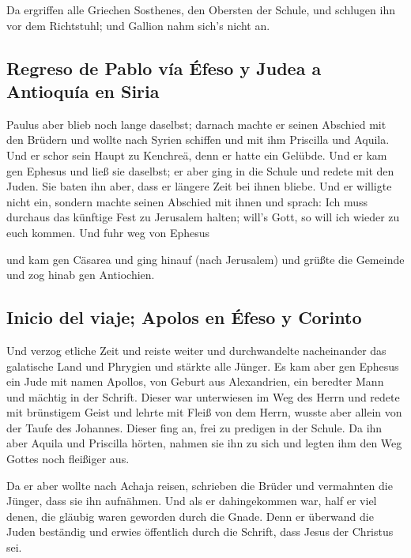  Da ergriffen alle Griechen Sosthenes, den Obersten der
Schule, und schlugen ihn vor dem Richtstuhl; und Gallion nahm sich's
nicht an.

\hypertarget{regreso-de-pablo-vuxeda-uxe9feso-y-judea-a-antioquuxeda-en-siria}{%
\subsection{Regreso de Pablo vía Éfeso y Judea a Antioquía en
Siria}\label{regreso-de-pablo-vuxeda-uxe9feso-y-judea-a-antioquuxeda-en-siria}}

 Paulus aber blieb noch lange daselbst; darnach machte er
seinen Abschied mit den Brüdern und wollte nach Syrien schiffen und mit
ihm Priscilla und Aquila. Und er schor sein Haupt zu Kenchreä, denn er
hatte ein Gelübde.  Und er kam gen Ephesus und ließ sie
daselbst; er aber ging in die Schule und redete mit den Juden.
 Sie baten ihn aber, dass er längere Zeit bei ihnen
bliebe. Und er willigte nicht ein,  sondern machte seinen
Abschied mit ihnen und sprach: Ich muss durchaus das künftige Fest zu
Jerusalem halten; will's Gott, so will ich wieder zu euch kommen. Und
fuhr weg von Ephesus

 und kam gen Cäsarea und ging hinauf (nach Jerusalem) und
grüßte die Gemeinde und zog hinab gen Antiochien.

\hypertarget{inicio-del-viaje-apolos-en-uxe9feso-y-corinto}{%
\subsection{Inicio del viaje; Apolos en Éfeso y
Corinto}\label{inicio-del-viaje-apolos-en-uxe9feso-y-corinto}}

 Und verzog etliche Zeit und reiste weiter und
durchwandelte nacheinander das galatische Land und Phrygien und stärkte
alle Jünger.  Es kam aber gen Ephesus ein Jude mit namen
Apollos, von Geburt aus Alexandrien, ein beredter Mann und mächtig in
der Schrift.  Dieser war unterwiesen im Weg des Herrn und
redete mit brünstigem Geist und lehrte mit Fleiß von dem Herrn, wusste
aber allein von der Taufe des Johannes.  Dieser fing an,
frei zu predigen in der Schule. Da ihn aber Aquila und Priscilla hörten,
nahmen sie ihn zu sich und legten ihm den Weg Gottes noch fleißiger aus.

 Da er aber wollte nach Achaja reisen, schrieben die
Brüder und vermahnten die Jünger, dass sie ihn aufnähmen. Und als er
dahingekommen war, half er viel denen, die gläubig waren geworden durch
die Gnade.  Denn er überwand die Juden beständig und
erwies öffentlich durch die Schrift, dass Jesus der Christus sei.

